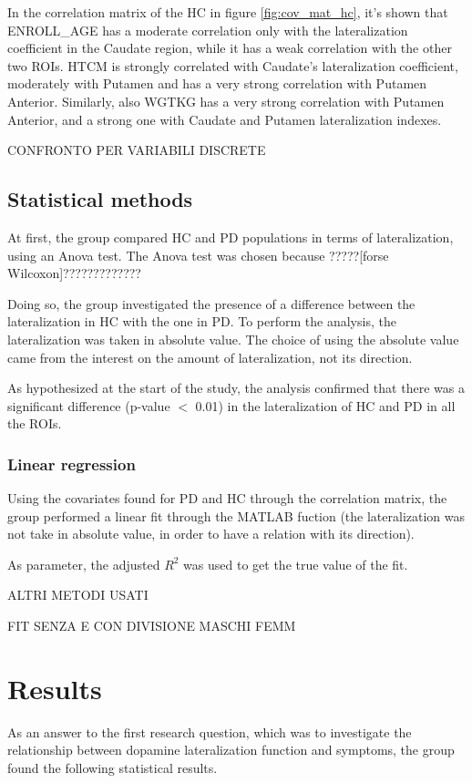 \documentclass[]{article}
\begin{document}
\begin{multicols}{2}

In the correlation matrix of the HC in figure \ref{fig:cov_mat_hc}, it's shown that ENROLL\_AGE has a moderate correlation only with the lateralization coefficient in the Caudate region, while it has a weak correlation with the other two ROIs. HTCM is strongly correlated with Caudate's lateralization coefficient, moderately with Putamen and has a very strong correlation with Putamen Anterior. Similarly, also WGTKG has a very strong correlation with Putamen Anterior, and a strong one with Caudate and Putamen lateralization indexes.



CONFRONTO PER VARIABILI DISCRETE

\subsection{Statistical methods}

At first, the group compared HC and PD populations in terms of lateralization, using an Anova test. The Anova test was chosen because ?????[forse Wilcoxon]?????????????

Doing so, the group investigated the presence of a difference between the lateralization in HC with the one in PD. To perform the analysis, the lateralization was taken in absolute value. The choice of using the absolute value came from the interest on the amount of lateralization, not its direction.

As hypothesized at the start of the study, the analysis confirmed that there was a significant difference (p-value $<$ 0.01) in the lateralization of HC and PD in all the ROIs. 

\subsubsection{Linear regression}

Using the covariates found for PD and HC through the correlation matrix, the group performed a linear fit through the MATLAB fuction  (the lateralization was not take in absolute value, in order to have a relation with its direction).

As parameter, the adjusted $R^2$ was used to get the true value of the fit.

ALTRI METODI USATI

FIT SENZA E CON DIVISIONE MASCHI FEMM

\section{Results}

As an answer to the first research question, which was to investigate the relationship between dopamine lateralization function and symptoms, the group found the following statistical results. 

\end{multicols}
\end{document}
